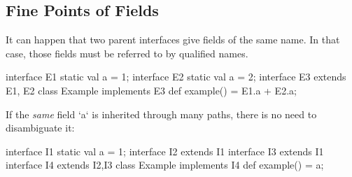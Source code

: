 \subsection{Fine Points of Fields}

It can happen that two parent interfaces give fields of the same name.  In
that case, those fields must be referred to by qualified names.
%
\begin{xten}
interface E1 {static val a = 1;}
interface E2 {static val a = 2;}
interface E3 extends E1, E2{}
class Example implements E3 {
  def example() = E1.a + E2.a;
}
\end{xten}
%

If the {\em same} field \xcd`a` is inherited through many paths, there is no need to
disambiguate it:
\begin{xten}
interface I1 { static val a = 1;} 
interface I2 extends I1 {}
interface I3 extends I1 {}
interface I4 extends I2,I3 {}
class Example implements I4 {
  def example() = a;
}
\end{xten}
%



